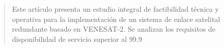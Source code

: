 \begin{abstract}
Este artículo presenta un estudio integral de factibilidad técnica y operativa para la implementación de un sistema de enlace satelital redundante basado en VENESAT-2. Se analizan los requisitos de disponibilidad de servicio superior al 99.9%
\end{abstract}